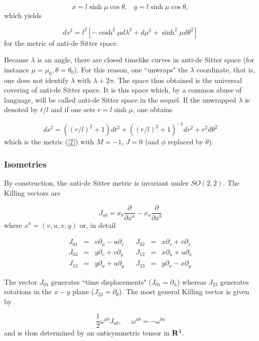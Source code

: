 \documentclass[12pt]{article}
\newcounter{c1} \newcounter{c2}
\newcommand{\bb}{\begin{equation}}
\newcommand{\ee}{\end{equation}}
\newcommand{\p}{\partial}
\newcommand{\m}{\mbox{$\frac{1}{2}$}}
\begin{document}
\bb
x=l\sinh\mu \cos \theta, \;\;\; y=l\sinh \mu \cos \theta,
\label{3.5}
\ee
%
which yields

\bb
ds^2= l^2\left[ -\cosh^2 \mu d\lambda^2 + d \mu^2 + \sinh^2 \mu
d\theta^2 \right]
\label{3.6}
\ee
%
for the metric of anti-de Sitter space.

Because $\lambda$ is an angle, there are closed timelike curves
in anti-de Sitter space (for instance $\mu=\mu_{0},
\theta =\theta_{0}$). For this reason, one ``unwraps" the $\lambda$
coordinate, that is, one does not identify $\lambda$ with
$\lambda+2\pi$. The space thus obtained is the universal
covering of anti-de Sitter space. It is this space which, by a
common abuse of language, will be called anti-de Sitter space in
the sequel. If the unwrapped $\lambda$ is denoted by $t/l$ and
if one sets $r=l\sinh\mu$, one obtains

\bb
ds^2= ((r/l)^2+1)dt^2 + ((r/l)^2+1)^{-1}dr^2 +r^2d\theta^2
\label{3.6.5}
\ee
%
which is the metric (\ref{7}) with $M=-1$, $J=0$ (and
$\phi$ replaced by $\theta$).


\subsubsection{Isometries}

By construction, the anti-de Sitter metric is invariant under
$SO(2,2)$. The Killing vectors are

\bb
J_{a b}=x_b \frac{\p}{\p x^a} - x_a
\frac{\p}{\p x^b}
\label{3.7}
\ee
%
where $x^a=(v,u,x,y)$ or, in detail

\bb
\begin{array}{rclcrcl}
J_{01} &=& v\p_u - u \p_v \;\;&\; J_{02} &=& x\p_v
+ v \p_x \\
J_{03} &=& y\p_v + v \p_y \;\;&\; J_{12} &=& x\p_u
+ u \p_x \\
J_{13} &=& y\p_u + u \p_y \;\;&\; J_{23} &=& y\p_x
- x \p_y
\end{array}
\label{3.8}
\ee

The vector $J_{01}$ generates ``time displacements"
($J_{01}=\p_{\lambda}$) whereas $J_{23}$ generates
rotations in the $x-y$ plane ($J_{23}=\p_{\theta}$). The
most general Killing vector is given by

\bb
\m \omega^{ab} J_{ab},\;\; \;\;\; \omega^{ab}=-\omega^{ba}
\label{3.9}
\ee
%
and is thus determined by an antisymmetric tensor in ${\bf R}^4$.

\end{document}
